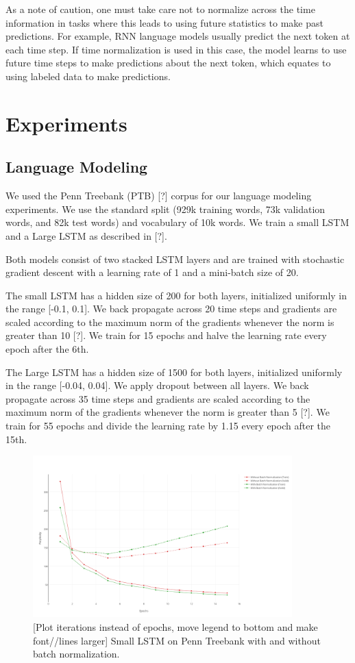\documentclass{article}
\begin{document}
As a note of caution, one must take care not to normalize across the time information in tasks where this leads to using future statistics to make past predictions. For example, RNN language models usually predict the next token at each time step. If time normalization is used in this case, the model learns to use future time steps to make predictions about the next token, which equates to using labeled data to make predictions.


\section{Experiments}

\subsection{Language Modeling}
We used the Penn Treebank (PTB) [?] corpus for our language modeling experiments. We use the standard split (929k training words, 73k validation words, and 82k test words) and vocabulary of 10k words. We train a small LSTM and a Large LSTM as described in [?].

Both models consist of two stacked LSTM layers and are trained with stochastic gradient descent with a learning rate of 1 and a mini-batch size of 20.

The small LSTM has a hidden size of 200 for both layers, initialized uniformly in the range [-0.1, 0.1]. We back propagate across 20 time steps and gradients are scaled according to the maximum norm of the gradients whenever the norm is greater than 10 [?]. We train for 15 epochs and halve the learning rate every epoch after the 6th.  

The Large LSTM has a hidden size of 1500 for both layers, initialized uniformly in the range [-0.04, 0.04]. We apply dropout between all layers. We back propagate across 35 time steps and gradients are scaled according to the maximum norm of the gradients whenever the norm is greater than 5 [?]. We train for 55 epochs and divide the learning rate by 1.15 every epoch after the 15th.

\begin{figure}[t]
  \centering
  \includegraphics[width=100mm]{ptb_small_norm_plot.png}
  \caption{[Plot iterations instead of epochs, move legend to bottom and make font//lines larger] Small LSTM on Penn Treebank with and without batch normalization.}
  \label{overflow}
\end{figure}
\end{document}
